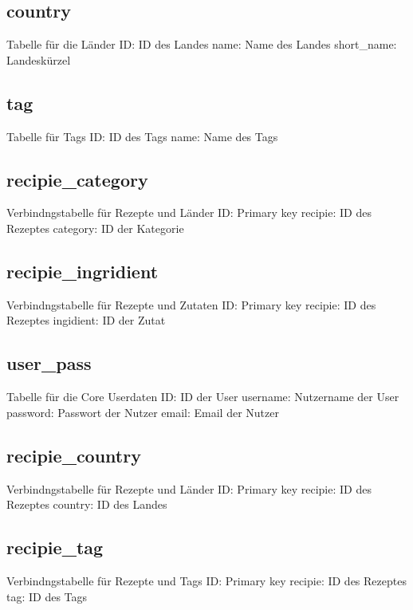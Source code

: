 \documentclass{article}
\begin{document}
\subsection{country}
Tabelle für die Länder
ID: ID des Landes
\newline
name: Name des Landes
\newline
short\_name: Landeskürzel

\subsection{tag}
Tabelle für Tags
ID: ID des Tags
\newline
name: Name des Tags

\subsection{recipie\_category}
Verbindngstabelle für Rezepte und Länder
ID: Primary key
\newline
recipie: ID des Rezeptes
\newline
category: ID der Kategorie

\subsection{recipie\_ingridient}
Verbindngstabelle für Rezepte und Zutaten
ID: Primary key
\newline
recipie: ID des Rezeptes
\newline
ingidient: ID der Zutat

\subsection{user\_pass}
Tabelle für die Core Userdaten
ID: ID der User
\newline
username: Nutzername der User
\newline
password: Passwort der Nutzer
\newline
email: Email der Nutzer

\subsection{recipie\_country}
Verbindngstabelle für Rezepte und Länder
ID: Primary key
\newline
recipie: ID des Rezeptes
\newline
country: ID des Landes

\subsection{recipie\_tag}
Verbindngstabelle für Rezepte und Tags
ID: Primary key
\newline
recipie: ID des Rezeptes
\newline
tag: ID des Tags
\end{document}
